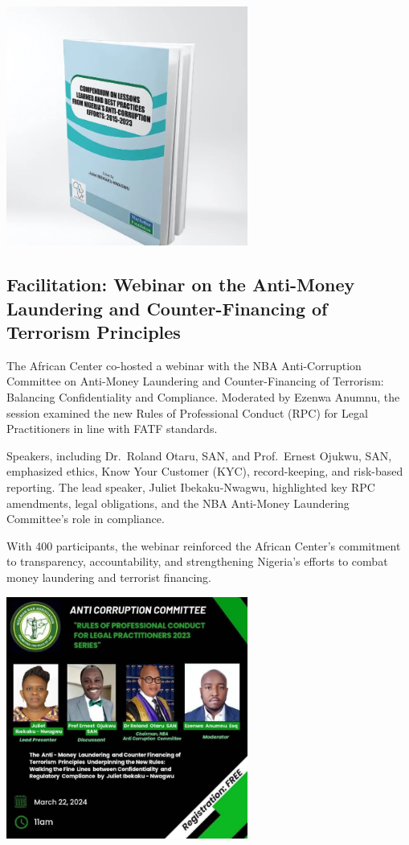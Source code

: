 \documentclass[
  letterpaper,
  DIV=11,
  numbers=noendperiod]{scrreprt}
\begin{document}
\begin{center}
\includegraphics[width=3.125in,height=\textheight,keepaspectratio]{images/strengthen/04_compendium.png}
\end{center}

\subsection{Facilitation: Webinar on the Anti-Money Laundering and
Counter-Financing of Terrorism
Principles}\label{facilitation-webinar-on-the-anti-money-laundering-and-counter-financing-of-terrorism-principles}

The African Center co-hosted a webinar with the NBA Anti-Corruption
Committee on Anti-Money Laundering and Counter-Financing of Terrorism:
Balancing Confidentiality and Compliance. Moderated by Ezenwa Anumnu,
the session examined the new Rules of Professional Conduct (RPC) for
Legal Practitioners in line with FATF standards.

Speakers, including Dr.~Roland Otaru, SAN, and Prof.~Ernest Ojukwu, SAN,
emphasized ethics, Know Your Customer (KYC), record-keeping, and
risk-based reporting. The lead speaker, Juliet Ibekaku-Nwagwu,
highlighted key RPC amendments, legal obligations, and the NBA
Anti-Money Laundering Committee's role in compliance.

With 400 participants, the webinar reinforced the African Center's
commitment to transparency, accountability, and strengthening Nigeria's
efforts to combat money laundering and terrorist financing.

\begin{center}
\includegraphics[width=3.125in,height=\textheight,keepaspectratio]{images/strengthen/05_webinar.jpg}
\end{center}
\end{document}
